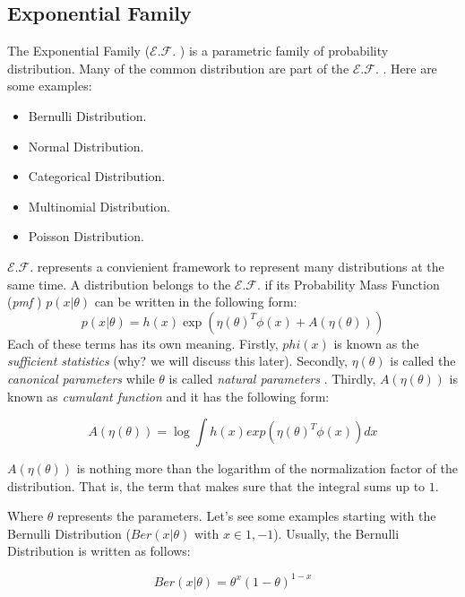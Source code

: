 \newcommand{\EF}{$\mathcal{E.F.}$ }
\newcommand{\pmf}{\textit{pmf} }
\newcommand{\suffstat}{\textit{sufficient statistics} }
\newcommand{\canonparam}{\textit{canonical parameters} }
\newcommand{\cumfun}{\textit{cumulant function} }
\newcommand{\natparam}{\textit{natural parameters} }

\subsection{Exponential Family}

The Exponential Family (\EF) is a parametric family of probability distribution. Many of the common distribution are part of the \EF. Here are some examples: 
\begin{itemize}
	\item Bernulli Distribution.
	\item Normal Distribution.
	\item Categorical Distribution.
	\item Multinomial Distribution.
	\item Poisson Distribution.
\end{itemize}
\EF represents a convienient framework to represent many distributions at the same time. A distribution belongs to the \EF if its Probability Mass Function (\pmf) $p(x|\theta)$ can be written in the following form:
\begin{equation}
	p(x|\theta) = h(x)\exp(\eta(\theta)^T\phi(x)+A(\eta(\theta)))
	\label{eq:EF}
\end{equation}
Each of these terms has its own meaning. Firstly, $phi(x)$ is known as the \suffstat (why? we will discuss this later). Secondly, $\eta(\theta)$ is called the \canonparam while $\theta$ is called \natparam. Thirdly, $A(\eta(\theta))$ is known as \cumfun and it has the following form:

\begin{equation}
	A(\eta(\theta)) = \log \int h(x)exp(\eta(\theta)^T\phi(x))dx
\end{equation}

$A(\eta(\theta))$ is nothing more than the logarithm of the normalization factor of the distribution. That is, the term that makes sure that the integral sums up to $1$.

Where $\theta$ represents the parameters. Let's see some examples starting with the Bernulli Distribution ($Ber(x|\theta)$ with $x\in{1,-1}$). Usually, the Bernulli Distribution is written as follows:

\begin{equation}
	Ber(x|\theta) = \theta^x(1-\theta)^{1-x}
	\label{eq:bernulli}
\end{equation}

